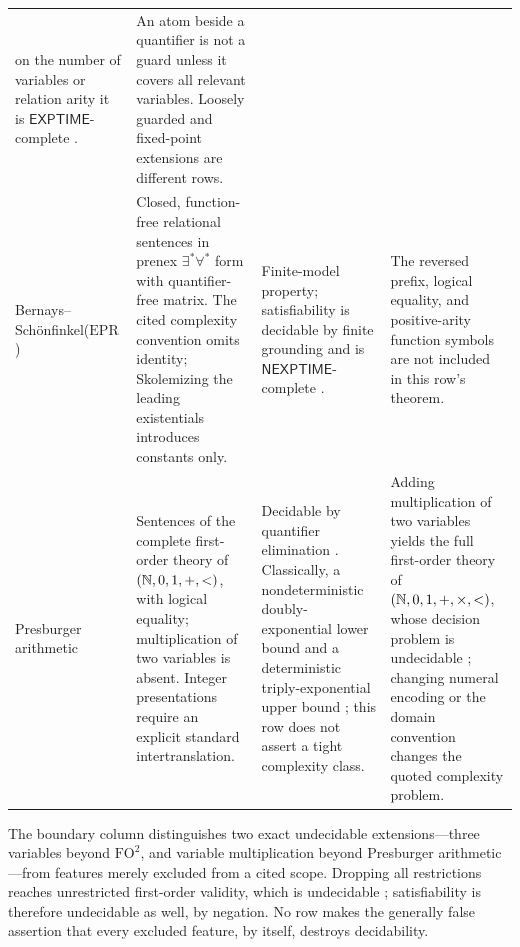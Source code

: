 \begin{landscape}
\begin{longtable}{@{}p{.90in}p{2.20in}p{2.10in}p{2.00in}@{}}
on the number of variables or relation arity it is
\(\mathsf{EXPTIME}\)-complete \cite{Gradel1999}. &
An atom beside a quantifier is not a guard unless it covers all relevant
variables.  Loosely guarded and fixed-point extensions are different rows. \\
\addlinespace
Bernays--Sch\"onfinkel\newline(\(\mathrm{EPR}\))
\index{Bernays--Schonfinkel class@Bernays--Sch\"onfinkel class}
\index{effectively propositional logic} &
Closed, function-free relational sentences in prenex
\(\exists^{*}\forall^{*}\) form with quantifier-free matrix.  The cited
complexity convention omits identity; Skolemizing the leading existentials
introduces constants only. &
Finite-model property; satisfiability is decidable by finite grounding and is
\(\mathsf{NEXPTIME}\)-complete \cite{Lewis1980}. &
The reversed prefix, logical equality, and positive-arity function symbols are
not included in this row's theorem. \\
\addlinespace
Presburger arithmetic
\index{Presburger arithmetic} &
Sentences of the complete first-order theory of
\((\mathbb{N},0,1,+,<)\), with logical equality; multiplication of two variables is
absent.  Integer presentations require an explicit standard intertranslation. &
Decidable by quantifier elimination \cite{Presburger1929}.  Classically, a
nondeterministic doubly-exponential lower bound
\cite{FischerRabin1974} and a deterministic triply-exponential upper bound
\cite{Oppen1978}; this row does not assert a tight complexity class. &
Adding multiplication of two variables yields the full first-order theory of
\((\mathbb{N},0,1,+,\times,<)\), whose decision problem is undecidable
\cite{DavisPutnamRobinson1961,Matiyasevich1970}; changing numeral encoding or the domain
convention changes the quoted complexity problem. \\
\bottomrule
\end{longtable}
\endgroup
\end{landscape}

The boundary column distinguishes two exact undecidable extensions---three
variables beyond \(\mathrm{FO}^{2}\), and variable multiplication beyond
Presburger arithmetic---from features merely excluded from a cited scope.
Dropping all restrictions reaches unrestricted first-order validity, which is
undecidable \cite{Church1936,Turing1937}; satisfiability is therefore
undecidable as well, by negation.  No row makes the generally false assertion
that every excluded feature, by itself, destroys decidability.

